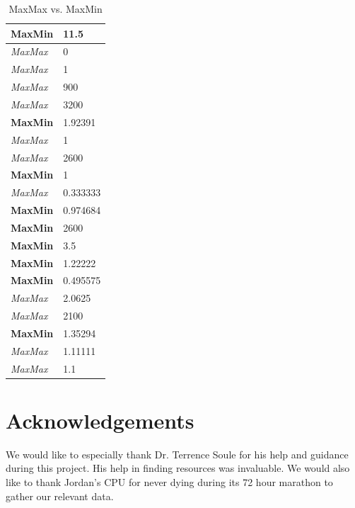 \documentclass{acm_proc_article-sp}
\begin{document}
\begin{table}[h]
\centering
\label{tMAXMAXvMAXMIN}
\caption{MaxMax vs. MaxMin}
\begin{tabular}{|l|p{1in}|}
\hline
\textbf{MaxMin} & 11.5 \\
\hline
\textit{MaxMax} & 0 \\
\hline
\textit{MaxMax} & 1 \\
\hline
\textit{MaxMax} & 900 \\
\hline
\textit{MaxMax} & 3200 \\
\hline
\textbf{MaxMin} & 1.92391 \\
\hline
\textit{MaxMax} & 1 \\
\hline
\textit{MaxMax} & 2600 \\
\hline
\textbf{MaxMin} & 1 \\
\hline
\textit{MaxMax} & 0.333333 \\
\hline
\textbf{MaxMin} & 0.974684 \\
\hline
\textbf{MaxMin} & 2600 \\
\hline
\textbf{MaxMin} & 3.5 \\
\hline
\textbf{MaxMin} & 1.22222 \\
\hline
\textbf{MaxMin} & 0.495575 \\
\hline
\textit{MaxMax} & 2.0625 \\
\hline
\textit{MaxMax} & 2100 \\
\hline
\textbf{MaxMin} & 1.35294 \\
\hline
\textit{MaxMax} & 1.11111\\
\hline
\textit{MaxMax} & 1.1 \\
\hline
\end{tabular}
\end{table}

%

%
%

\section{Acknowledgements}
We would like to especially thank Dr. Terrence Soule for his help and guidance during this project. His help in finding resources was invaluable. We would also like to thank Jordan's CPU for never dying during its 72 hour marathon to gather our relevant data.
\end{document}
